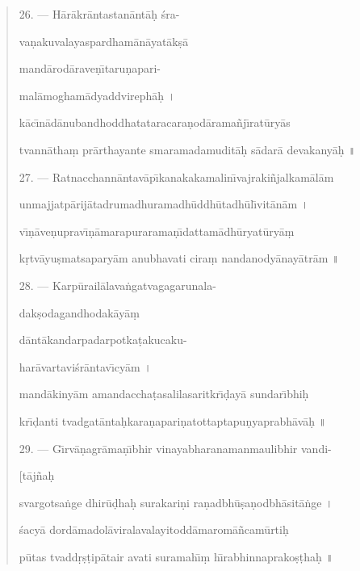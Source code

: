\documentclass[a4paper, 11pt, oneside, french, landscape, twocolumn]{article}
\begin{document}
\begin{quotation}
26. --- H\={a}r\={a}kr\={a}ntastan\={a}nt\={a}\d{h} \'{s}ra-

va\d{n}akuvalayaspardham\={a}n\={a}yat\={a}k\d{s}\={a}

mand\={a}rod\={a}rave\d{n}\={\i}taru\d{n}apari-

mal\={a}mogham\={a}dyaddvireph\={a}\d{h} \texthindi{।}

k\={a}c\={\i}n\={a}d\={a}nubandhoddhatataracara\d{n}od\={a}rama\~{n}j\={\i}rat\={u}ry\={a}s

tvann\={a}tha\d{m} pr\={a}rthayante smaramadamudit\={a}\d{h} s\={a}dar\={a} devakany\={a}\d{h} \texthindi{॥}

\bigskip

27. --- Ratnacchann\={a}ntav\={a}p\={\i}kanakakamalin\={\i}vajraki\~{n}jalkam\={a}l\={a}m

unmajjatp\={a}rij\={a}tadrumadhuramadh\={u}ddh\={u}tadh\={u}l\={\i}vit\={a}n\={a}m \texthindi{।}

v\={\i}\d{n}\={a}ve\d{n}uprav\={\i}\d{n}\={a}marapurarama\d{n}\={\i}dattam\={a}dh\={u}ryat\={u}ry\={a}\d{m}

k\d{r}tv\={a}yu\d{s}matsapary\={a}m anubhavati cira\d{m} nandanody\={a}nay\={a}tr\={a}m \texthindi{॥}

\bigskip

28. --- Karp\={u}rail\={a}lava\.{n}gatvagagarunala-

dak\d{s}odagandhodak\={a}y\={a}\d{m}

d\={a}nt\={a}kandarpadarpotka\d{t}akucaku-

har\={a}vartavi\'{s}r\={a}ntav\={\i}cy\={a}m \texthindi{।}

mand\={a}kiny\={a}m amandaccha\d{t}asalilasaritkr\={\i}\d{d}ay\={a} sundar\={\i}bhi\d{h}

kr\={\i}\d{d}anti tvadgat\={a}nta\d{h}kara\d{n}apari\d{n}atottaptapu\d{n}yaprabh\={a}v\={a}\d{h} \texthindi{॥}

\bigskip

29. --- G\={\i}rv\={a}\d{n}agr\={a}ma\d{n}\={\i}bhir vinayabharanamanmaulibhir vandi-

\hspace*{55mm}[t\={a}j\~{n}a\d{h}

svargotsa\.{n}ge dhir\={u}\d{d}ha\d{h} surakari\d{n}i ra\d{n}adbh\={u}\d{s}a\d{n}odbh\={a}sit\={a}\.{n}ge \texthindi{।}

\'{s}acy\={a} dord\={a}madol\={a}viralavalayitodd\={a}marom\={a}\~{n}cam\={u}rti\d{h}

p\={u}tas tvadd\d{r}\d{s}\d{t}ip\={a}tair avati suramah\={\i}\d{m} h\={\i}rabhinnaprako\d{s}\d{t}ha\d{h} \texthindi{॥}


\end{quotation}
\end{document}

